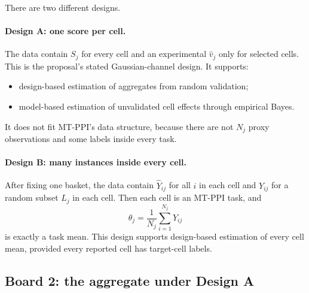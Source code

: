 \documentclass[11pt]{article}
\begin{document}
  There are two different designs.
  
  \paragraph{Design A: one score per cell.}
  The data contain \(S_j\) for every cell and an experimental
  \(\widehat v_j\) only for selected cells. This is the proposal's stated
  Gaussian-channel design. It supports:
  \begin{itemize}[leftmargin=2em]
      \item design-based estimation of aggregates from random validation;
      \item model-based estimation of unvalidated cell effects through empirical
      Bayes.
  \end{itemize}
  It does not fit MT-PPI's data structure, because there are not \(N_j\) proxy
  observations and some labels inside every task.
  
  \paragraph{Design B: many instances inside every cell.}
  After fixing one basket, the data contain \(\widehat Y_{ij}\) for all \(i\) in
  each cell and \(Y_{ij}\) for a random subset \(L_j\) in each cell. Then each
  cell is an
  MT-PPI task, and
  \[
      \theta_j=\frac{1}{N_j}\sum_{i=1}^{N_j}Y_{ij}
  \]
  is exactly a task mean. This design supports design-based estimation of every
  cell mean, provided every reported cell has target-cell labels.
  
  \subsection*{Board 2: the aggregate under Design A}
  
\end{document}

